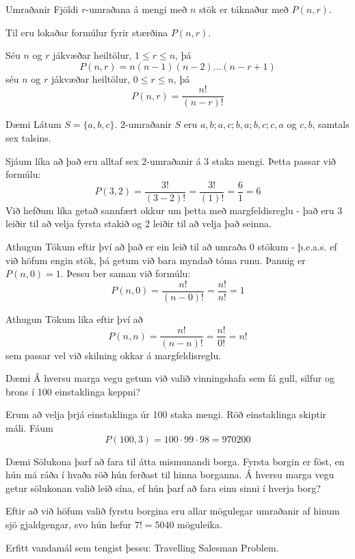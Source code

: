 \documentclass{beamer}
\begin{document}
\begin{frame}{Umraðanir}
Fjöldi $r$-umraðana á mengi með $n$ stök er táknaður með $P(n, r)$.

Til eru lokaðar formúlur fyrir stærðina $P(n,r)$. 

Séu $n$ og $r$ jákvæðar heiltölur, $1 \leq r \leq n$, þá
\[
 P (n, r) = n(n - 1)(n - 2) \ldots (n - r + 1)
\]
séu $n$ og $r$ jákvæðar heiltölur, $0 \leq r \leq n$, þá
\[
 P(n,r) = \frac{n!}{(n-r)!}
\]
\end{frame}

\begin{frame}{Dæmi}
Látum $S = \{a, b, c\}$. $2$-umraðanir $S$ eru $a, b; a, c; b, a;b, c; c, a$ og $c, b$, samtals sex talsins.

Sjáum líka að það eru alltaf sex $2$-umraðanir á 3 staka mengi. Þetta passar við formúlu:
\[
 P(3,2) = \frac{3!}{(3-2)!} = \frac{3!}{(1)!} = \frac{6}{1} = 6
\]
Við hefðum líka getað sannfært okkur um þetta með margfeldisreglu - það eru 3 leiðir til að velja fyrsta stakið og 2 leiðir til að velja það seinna.
\end{frame}

\begin{frame}{Athugun}
Tökum eftir því að það er ein leið til að umraða 0 stökum - þ.e.a.s. ef við höfum engin stök, þá getum við bara myndað tóma runu. Þannig er $P(n,0) = 1$. Þessu ber saman við formúlu:
\[
 P(n,0) = \frac{n!}{(n-0)!} = \frac{n!}{n!} = 1
\]
\end{frame}

\begin{frame}{Athugun}
Tökum líka eftir því að 
\[
 P(n,n) = \frac{n!}{(n-n)!} = \frac{n!}{0!} = n!
\]
sem passar vel við skilning okkar á margfeldisreglu.
\end{frame}

\begin{frame}{Dæmi}
Á hversu marga vegu getum við valið vinningshafa sem fá gull, silfur og brons í 100 einstaklinga keppni? \pause

Erum að velja þrjá einstaklinga úr 100 staka mengi. Röð einstaklinga skiptir máli. Fáum
\[
 P(100,3) = 100 \cdot 99 \cdot 98 = 970200
\]
\end{frame}

\begin{frame}{Dæmi}
Sölukona þarf að fara til átta mismunandi borga. Fyrsta borgin er föst, en hún má ráða í hvaða röð hún ferðast til hinna borganna. Á hversu marga vegu getur sölukonan valið leið sína, ef hún þarf að fara einu sinni í hverja borg? \pause

Eftir að við höfum valið fyrstu borgina eru allar mögulegar umraðanir af hinum sjö gjaldgengar, svo hún hefur $7! = 5040$ möguleika.

Erfitt vandamál sem tengist þessu: Travelling Salesman Problem.
\end{frame}
\end{document}
